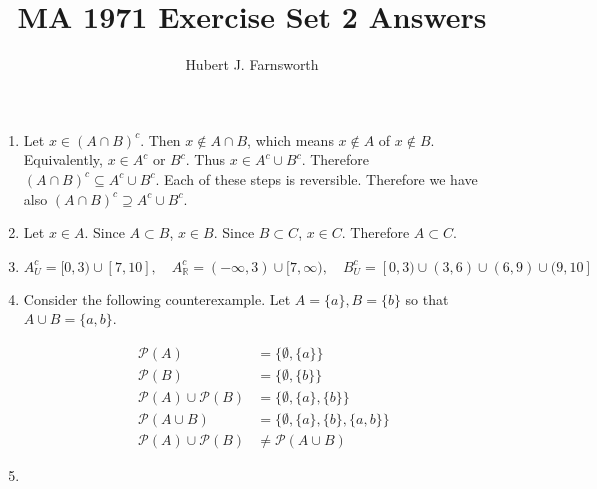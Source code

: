\documentclass[a4paper]{article}
\title{MA 1971 Exercise Set 2 Answers}
\author{Hubert J. Farnsworth}
\begin{document}
\maketitle

\begin{enumerate}

\item

Let $x \in (A \cap B)^c$. Then $x \not \in A\cap B$, which means $x \not \in A$ of $x \not \in B$. Equivalently, $x \in A^c$ or $B^c$. Thus $x \in A^c \cup B^c$. Therefore $ (A \cap B)^c \subseteq A^c \cup B^c$. Each of these steps is reversible. Therefore we have also $ (A \cap B)^c \supseteq A^c \cup B^c$.

	
\item

Let $x \in A$. Since $A \subset B$, $x \in B$. Since $B \subset C$, $x \in C$. Therefore $A \subset C$. 


\item

$$	
A_U^c = [0,3)\cup [7, 10], \quad
A_{\mathbb{R}}^c = (-\infty, 3) \cup [7, \infty), \quad
B_U^c = [0,3) \cup (3, 6) \cup (6, 9) \cup (9, 10] 
$$
	


\item

Consider the following counterexample. Let $A = \{a\}, B = \{b\}$ so that $A\cup B = \{a,b\}$.

\begin{align*}
\mathcal{P}(A) &= \{\emptyset, \{a\}\} \\
\mathcal{P}(B) & = \{\emptyset, \{b\} \} \\
\mathcal{P}(A) \cup \mathcal{P}(B) &= \{\emptyset, \{a\},\{b\} \} \\
\mathcal{P}(A\cup B) &= \{\emptyset, \{a\},\{b\}, \{a,b\} \} \\
\mathcal{P}(A) \cup \mathcal{P}(B) &\neq \mathcal{P}(A\cup B)
\end{align*}

\item

\begin{enumerate}


\end{enumerate}
\end{enumerate}
\end{document}
